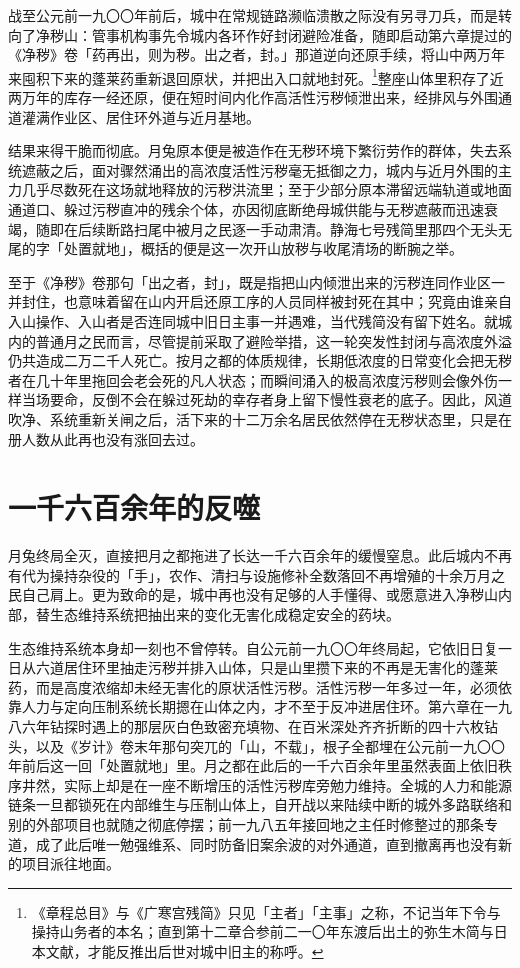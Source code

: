 战至公元前一九〇〇年前后，城中在常规链路濒临溃散之际没有另寻刀兵，而是转向了净秽山：管事机构事先令城内各环作好封闭避险准备，随即启动第六章提过的《净秽》卷「药再出，则为秽。出之者，封。」那道逆向还原手续，将山中两万年来囤积下来的蓬莱药重新退回原状，并把出入口就地封死。\footnote{《章程总目》与《广寒宫残简》只见「主者」「主事」之称，不记当年下令与操持山务者的本名；直到第十二章合参前二一〇年东渡后出土的弥生木简与日本文献，才能反推出后世对城中旧主的称呼。}整座山体里积存了近两万年的库存一经还原，便在短时间内化作高活性污秽倾泄出来，经排风与外围通道灌满作业区、居住环外道与近月基地。

结果来得干脆而彻底。月兔原本便是被造作在无秽环境下繁衍劳作的群体，失去系统遮蔽之后，面对骤然涌出的高浓度活性污秽毫无抵御之力，城内与近月外围的主力几乎尽数死在这场就地释放的污秽洪流里；至于少部分原本滞留远端轨道或地面通道口、躲过污秽直冲的残余个体，亦因彻底断绝母城供能与无秽遮蔽而迅速衰竭，随即在后续断路扫尾中被月之民逐一手动肃清。静海七号残简里那四个无头无尾的字「处置就地」，概括的便是这一次开山放秽与收尾清场的断腕之举。

至于《净秽》卷那句「出之者，封」，既是指把山内倾泄出来的污秽连同作业区一并封住，也意味着留在山内开启还原工序的人员同样被封死在其中；究竟由谁亲自入山操作、入山者是否连同城中旧日主事一并遇难，当代残简没有留下姓名。就城内的普通月之民而言，尽管提前采取了避险举措，这一轮突发性封闭与高浓度外溢仍共造成二万二千人死亡。按月之都的体质规律，长期低浓度的日常变化会把无秽者在几十年里拖回会老会死的凡人状态；而瞬间涌入的极高浓度污秽则会像外伤一样当场要命，反倒不会在躲过死劫的幸存者身上留下慢性衰老的底子。因此，风道吹净、系统重新关闸之后，活下来的十二万余名居民依然停在无秽状态里，只是在册人数从此再也没有涨回去过。

\section{一千六百余年的反噬}

月兔终局全灭，直接把月之都拖进了长达一千六百余年的缓慢窒息。此后城内不再有代为操持杂役的「手」，农作、清扫与设施修补全数落回不再增殖的十余万月之民自己肩上。更为致命的是，城中再也没有足够的人手懂得、或愿意进入净秽山内部，替生态维持系统把抽出来的变化无害化成稳定安全的药块。

生态维持系统本身却一刻也不曾停转。自公元前一九〇〇年终局起，它依旧日复一日从六道居住环里抽走污秽并排入山体，只是山里攒下来的不再是无害化的蓬莱药，而是高度浓缩却未经无害化的原状活性污秽。活性污秽一年多过一年，必须依靠人力与定向压制系统长期摁在山体之内，才不至于反冲进居住环。第六章在一九八六年钻探时遇上的那层灰白色致密充填物、在百米深处齐齐折断的四十六枚钻头，以及《岁计》卷末年那句突兀的「山，不载」，根子全都埋在公元前一九〇〇年前后这一回「处置就地」里。月之都在此后的一千六百余年里虽然表面上依旧秩序井然，实际上却是在一座不断增压的活性污秽库旁勉力维持。全城的人力和能源链条一旦都锁死在内部维生与压制山体上，自开战以来陆续中断的城外多路联络和别的外部项目也就随之彻底停摆；前一九八五年接回地之主任时修整过的那条专道，成了此后唯一勉强维系、同时防备旧案余波的对外通道，直到撤离再也没有新的项目派往地面。

